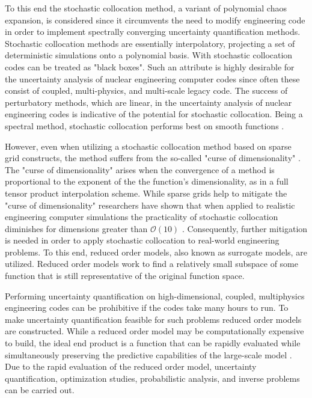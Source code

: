 To this end the stochastic collocation method, a variant of polynomial chaos expansion, is considered since it circumvents the need to modify engineering code in order to implement spectrally converging uncertainty quantification methods. Stochastic collocation methods are essentially interpolatory, projecting a set of deterministic simulations onto a polynomial basis. With stochastic collocation codes can be treated as "black boxes". Such an attribute is highly desirable for the uncertainty analysis of nuclear engineering computer codes since often these consist of coupled, multi-physics, and multi-scale legacy code. The success of perturbatory methods, which are linear, in the uncertainty analysis of nuclear engineering codes is indicative of the potential for stochastic collocation. Being a spectral method, stochastic collocation performs best on smooth functions \cite{BoydSpec}.    

However, even when utilizing a stochastic collocation method based on sparse grid constructs, the method suffers from the so-called "curse of dimensionality" \cite{LeMaitreKnio}. The "curse of dimensionality" arises when the convergence of a method is proportional to the exponent of the the function's dimensionality, as in a full tensor product interpolation scheme. While sparse grids help to mitigate the "curse of dimensionality" researchers have shown that when applied to realistic engineering computer simulations the practicality of stochastic collocation diminishes for dimensions greater than $\mathcal{O}(10)$ \cite{AHSGC_HighDimensions}. Consequently, further mitigation is needed in order to apply stochastic collocation to real-world engineering problems. To this end, reduced order models, also known as surrogate models, are utilized. Reduced order models work to find a relatively small subspace of some function that is still representative of the original function space. 

Performing uncertainty quantification on high-dimensional, coupled, multiphysics engineering codes can be prohibitive if the codes take many hours to run. To make uncertainty quantification feasible for such problems reduced order models are constructed. While a reduced order model may be computationally expensive to build, the ideal end product is a function that can be rapidly evaluated while simultaneously preserving the predictive capabilities of the large-scale model \cite{BuiThanh_Wilcox}. Due to the rapid evaluation of the reduced order model, uncertainty quantification, optimization studies, probabilistic analysis, and  inverse problems can be carried out. 

